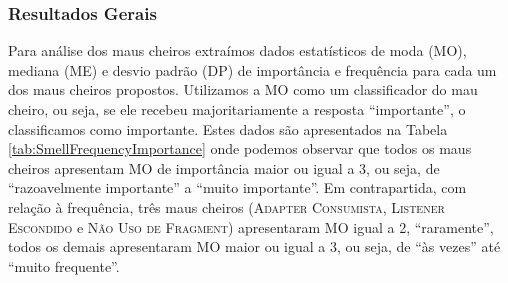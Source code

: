 
\subsubsection{Resultados Gerais}
\label{phase2-general-results}

Para análise dos maus cheiros extraímos dados estatísticos de moda (MO), mediana (ME) e desvio padrão (DP) de importância e frequência para cada um dos maus cheiros propostos. Utilizamos a MO como um classificador do mau cheiro, ou seja, se ele recebeu majoritariamente a resposta ``importante'', o classificamos como importante. Estes dados são apresentados na Tabela \ref{tab:SmellFrequencyImportance} onde podemos observar que todos os maus cheiros apresentam MO de importância maior ou igual a 3, ou seja, de ``razoavelmente importante'' a ``muito importante''. Em contrapartida, com relação à frequência, três maus cheiros (\textsc{\small Adapter Consumista}, \textsc{\small Listener Escondido} e \textsc{\small Não Uso de Fragment}) apresentaram MO igual a 2, ``raramente'', todos os demais apresentaram MO maior ou igual a 3, ou seja, de ``às vezes'' até ``muito frequente''.

